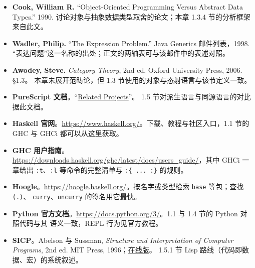 \begin{itemize}
\tightlist
\item
  \textbf{Cook, William R.} “Object-Oriented Programming Versus Abstract Data Types.” 1990.
  讨论对象与抽象数据类型取舍的论文；本章 1.3.4 节的分析框架来自此文。
\item
  \textbf{Wadler, Philip.} “The Expression Problem.” Java Generics 邮件列表，1998.
  “表达问题”这一名称的出处；正文的两轴表可与该邮件中的表述对照。
\item
  \textbf{Awodey, Steve.} \emph{Category Theory}, 2nd ed. Oxford University Press, 2006. §1.3。
  本章未展开范畴论，但 1.3 节使用的对象与态射语言与该节定义一致。
\item
  \textbf{PureScript 文档}。“\href{https://github.com/purescript/documentation/blob/master/Related-Projects.md}{Related Projects}”。
  1.5 节对派生语言与同源语言的对比据此文档。
\item
  \textbf{Haskell 官网}。\url{https://www.haskell.org/}。下载、教程与社区入口，1.1 节的 GHC 与 GHCi
  都可以从这里获取。
\item
  \textbf{GHC 用户指南}。\url{https://downloads.haskell.org/ghc/latest/docs/users_guide/}，其中
  GHCi 一章给出 \passthrough{\lstinline!:t!}、\passthrough{\lstinline!:l!} 等命令的完整清单与 \passthrough{\lstinline!:\{ ... :\}!} 的规则。
\item
  \textbf{Hoogle}。\url{https://hoogle.haskell.org/}。按名字或类型检索 \passthrough{\lstinline!base!} 等包；查找 \passthrough{\lstinline!(.)!}、
  \passthrough{\lstinline!curry!}、\passthrough{\lstinline!uncurry!} 的签名用它最快。
\item
  \textbf{Python 官方文档}。\url{https://docs.python.org/3/}。1.1 与 1.4 节的 Python 对照代码与其
  语义一致，REPL 行为见官方教程。
\item
  \textbf{SICP}。Abelson 与 Sussman, \emph{Structure and Interpretation of Computer Programs},
  2nd ed. MIT Press, 1996；\href{https://mitp-content-server.mit.edu/books/content/sectbyfn/books_pres_0/6515/sicp.zip/index.html}{在线版}。
  1.5.1 节 Lisp 路线（代码即数据、宏）的系统叙述。
\end{itemize}
